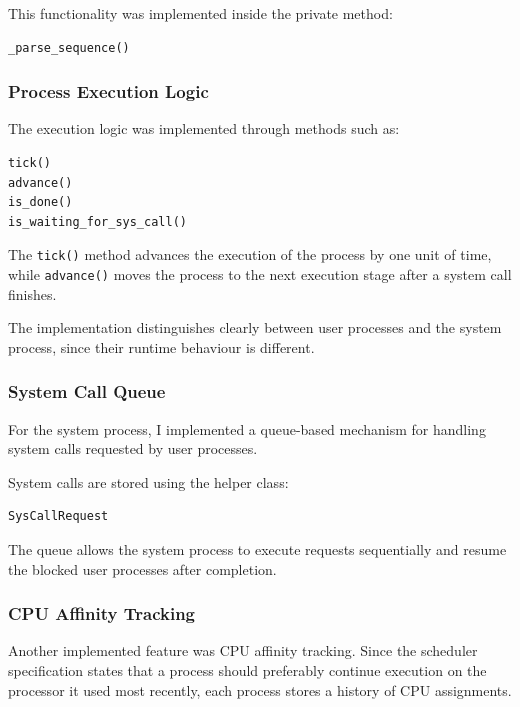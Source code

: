 \documentclass{article}
\begin{document}
This functionality was implemented inside the private method:

\begin{verbatim}
_parse_sequence()
\end{verbatim}



\subsubsection{Process Execution Logic}

The execution logic was implemented through methods such as:

\begin{verbatim}
tick()
advance()
is_done()
is_waiting_for_sys_call()
\end{verbatim}

The \texttt{tick()} method advances the execution of the process by one unit of time, while \texttt{advance()} moves the process to the next execution stage after a system call finishes.

The implementation distinguishes clearly between user processes and the system process, since their runtime behaviour is different.



\subsubsection{System Call Queue}

For the system process, I implemented a queue-based mechanism for handling system calls requested by user processes.

System calls are stored using the helper class:

\begin{verbatim}
SysCallRequest
\end{verbatim}

The queue allows the system process to execute requests sequentially and resume the blocked user processes after completion.



\subsubsection{CPU Affinity Tracking}

Another implemented feature was CPU affinity tracking.  
Since the scheduler specification states that a process should preferably continue execution on the processor it used most recently, each process stores a history of CPU assignments.
\end{document}
